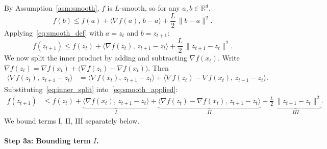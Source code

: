 \documentclass{article}
\begin{document}
By Assumption~\ref{asm:smooth}, $f$ is $L$-smooth, so for any
$a, b \in \mathbb{R}^d$,
\begin{equation}
f(b) \leq f(a) + \langle \nabla f(a),\, b - a \rangle
       + \frac{L}{2}\,\|b - a\|^2.
\label{eq:smooth_def}
\end{equation}
Applying~\eqref{eq:smooth_def} with $a = z_t$ and $b = z_{t+1}$:
\begin{equation}
f(z_{t+1}) \leq f(z_t) + \langle \nabla f(z_t),\, z_{t+1} - z_t \rangle
             + \frac{L}{2}\,\|z_{t+1} - z_t\|^2.
\label{eq:smooth_applied}
\end{equation}
We now split the inner product by adding and subtracting $\nabla f(x_t)$.
Write $\nabla f(z_t) = \nabla f(x_t) + \bigl(\nabla f(z_t) - \nabla f(x_t)\bigr)$.
Then
\begin{align}
\langle \nabla f(z_t),\, z_{t+1} - z_t \rangle
&= \langle \nabla f(x_t),\, z_{t+1} - z_t \rangle
   + \langle \nabla f(z_t) - \nabla f(x_t),\, z_{t+1} - z_t \rangle.
\label{eq:inner_split}
\end{align}
Substituting~\eqref{eq:inner_split} into~\eqref{eq:smooth_applied}:
\begin{align}
f(z_{t+1})
&\leq f(z_t)
  + \underbrace{\langle \nabla f(x_t),\, z_{t+1} - z_t \rangle}_{I}
  + \underbrace{\langle \nabla f(z_t) - \nabla f(x_t),\,
    z_{t+1} - z_t \rangle}_{II}
  + \underbrace{\frac{L}{2}\,\|z_{t+1} - z_t\|^2}_{III}.
\label{eq:three_terms}
\end{align}
We bound terms I, II, III separately below.

\paragraph{Step 3a: Bounding term $I$.}
\end{document}
